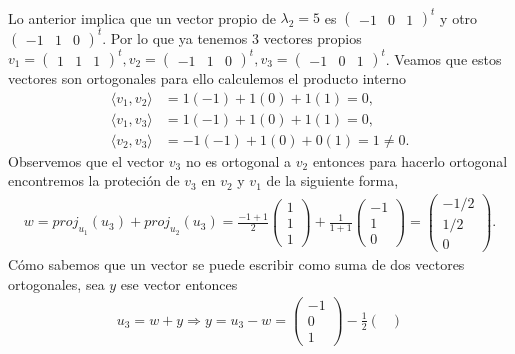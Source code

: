 \documentclass[11pt,letterpaper]{article}
\begin{document}
\begin{enumerate}
\begin{align*}
\end{align*}
Lo anterior implica que un vector propio de $\lambda_2=5$ es 
$\begin{pmatrix}
-1 & 0 & 1
\end{pmatrix}^t$ y otro $\begin{pmatrix}
-1 & 1 & 0
\end{pmatrix}^t$.  Por lo que ya tenemos 3 vectores propios $v_1=\begin{pmatrix}
1 & 1 & 1
\end{pmatrix}^t, v_2=\begin{pmatrix}
-1 & 1 & 0
\end{pmatrix}^t, v_3=\begin{pmatrix}
-1 & 0 & 1
\end{pmatrix}^t$. Veamos que estos vectores son ortogonales para ello calculemos el producto interno
\begin{align*}
\langle v_1, v_2 \rangle &= 1(-1)+1(0)+1(1)= 0,\\
\langle v_1, v_3 \rangle &= 1(-1)+1(0)+1(1)=0, \\
\langle v_2, v_3 \rangle &= -1(-1)+1(0)+0(1)=1\neq 0.
\end{align*}
Observemos que el vector $v_3$ no es ortogonal a $v_2$ entonces para hacerlo ortogonal encontremos la proteción de $v_3$ en $v_2$ y $v_1$ de la siguiente forma,
\begin{align*}
w=proj_{u_1}(u_3)+proj_{u_2}(u_3)=\frac{-1+1}{2}\begin{pmatrix}
1 \\1 \\1
\end{pmatrix}+\frac{1}{1+1}\begin{pmatrix}
-1\\ 1\\ 0
\end{pmatrix}=\begin{pmatrix}
-1/2\\ 1/2\\ 0
\end{pmatrix}.
\end{align*}
Cómo sabemos que un vector se puede escribir como suma de dos vectores ortogonales, sea $y$ ese vector entonces
\begin{align*}
u_3=w+y\Rightarrow y=u_3-w=\begin{pmatrix}
-1\\ 0 \\ 1 
\end{pmatrix}-\frac{1}{2}\begin{pmatrix}

\end{pmatrix}
\end{align*}
\end{enumerate}
\end{document}
